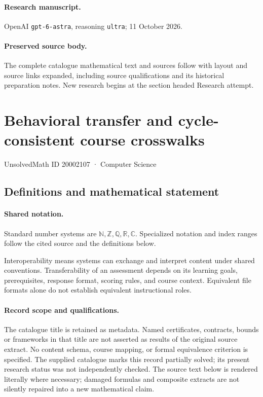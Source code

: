 \documentclass[11pt]{article}
\begin{document}
\paragraph{Research manuscript.} OpenAI \texttt{gpt-6-astra}, reasoning \texttt{ultra}; 11 October 2026.
\paragraph{Preserved source body.} The complete catalogue mathematical text and sources follow with layout and source links expanded, including source qualifications and its historical preparation notes. New research begins at the section headed Research attempt.

\section{Behavioral transfer and cycle-consistent course crosswalks}\label{20002107}
{\small UnsolvedMath ID 20002107 · Computer Science}
\subsection{Definitions and mathematical statement}

\paragraph{Shared notation.}Standard number systems are $\mathbb N,\mathbb Z,\mathbb Q,\mathbb R,\mathbb C$. Specialized notation and index ranges follow the cited source and the definitions below.


Interoperability means systems can exchange and interpret content under shared conventions. Transferability of an assessment depends on its learning goals, prerequisites, response format, scoring rules, and course context. Equivalent file formats alone do not establish equivalent instructional roles.
\paragraph{Record scope and qualifications.}
The catalogue title is retained as metadata. Named certificates, contracts, bounds or frameworks in that title are not asserted as results of the original source extract.
No content schema, course mapping, or formal equivalence criterion is specified. The supplied catalogue marks this record partially solved; its present research status was not independently checked.
The source text below is rendered literally where necessary; damaged formulas and composite extracts are not silently repaired into a new mathematical claim.
\end{document}
